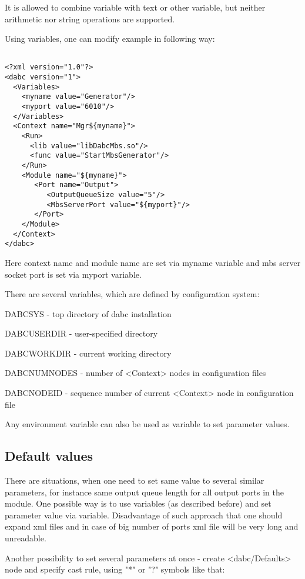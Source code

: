 It is allowed to combine variable with text or other variable, 
but neither arithmetic nor string operations are supported. 

Using variables, one can modify example in following way:

\begin{verbatim}

<?xml version="1.0"?>
<dabc version="1">
  <Variables>
    <myname value="Generator"/> 
    <myport value="6010"/> 
  </Variables>
  <Context name="Mgr${myname}">
    <Run>
      <lib value="libDabcMbs.so"/>
      <func value="StartMbsGenerator"/>
    </Run>
    <Module name="${myname}">
       <Port name="Output">
          <OutputQueueSize value="5"/>
          <MbsServerPort value="${myport}"/>
       </Port>
    </Module>
  </Context>
</dabc>

\end{verbatim}

Here context name and module name are set via myname variable and mbs server 
socket port is set via myport variable.

There are several variables, which are defined by configuration system:

\bbul
\item DABCSYS - top directory of dabc installation
\item DABCUSERDIR - user-specified directory
\item DABCWORKDIR - current working directory
\item DABCNUMNODES - number of <Context> nodes in configuration files
\item DABCNODEID - sequence number of current <Context> node in configuration file 
\ebul

Any environment variable can also be used as variable to set parameter values. 


\subsection{Default values}

There are situations, when one need to set same value to several similar parameters,
for instance same output queue length for all output ports in the module. One possible way
is to use variables (as described before) and set parameter value via variable. 
Disadvantage of such approach that one should expand xml files and in case 
of big number of ports xml file will be very long and unreadable.

Another possibility to set several parameters at once - create <dabc/Defaults> node and
specify cast rule, using "*" or "?" symbols like that: 

